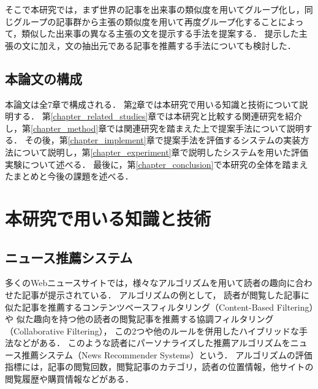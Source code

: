\documentclass[12pt,a4j,dvipdfmx]{jreport}
\begin{document}


そこで本研究では，まず世界の記事を出来事の類似度を用いてグループ化し，同じグループの記事群から主張の類似度を用いて再度グループ化することによって，類似した出来事の異なる主張の文を提示する手法を提案する．
提示した主張の文に加え，文の抽出元である記事を推薦する手法についても検討した．



\section{本論文の構成}
本論文は全7章で構成される．
第\ref{chapter_knowledge_and_technologies}章では本研究で用いる知識と技術について説明する．
第\ref{chapter_related_studies}章では本研究と比較する関連研究を紹介し，第\ref{chapter_method}章では関連研究を踏まえた上で提案手法について説明する．
その後，第\ref{chapter_implement}章で提案手法を評価するシステムの実装方法について説明し，第\ref{chapter_experiment}章で説明したシステムを用いた評価実験について述べる．
最後に，第\ref{chapter_conclusion}で本研究の全体を踏まえたまとめと今後の課題を述べる．

\chapter{本研究で用いる知識と技術}
\label{chapter_knowledge_and_technologies}
\section{ニュース推薦システム}
多くのWebニュースサイトでは，様々なアルゴリズムを用いて読者の趣向に合わせた記事が提示されている．
アルゴリズムの例として，
読者が閲覧した記事に似た記事を推薦するコンテンツベースフィルタリング（Content-Based Filtering）や
似た趣向を持つ他の読者の閲覧記事を推薦する協調フィルタリング（Collaborative Filtering），
この2つや他のルールを併用したハイブリッドな手法などがある\cite{karimi_news_2018}．
このような読者にパーソナライズした推薦アルゴリズムをニュース推薦システム（News Recommender Systems）という．
アルゴリズムの評価指標には，記事の閲覧回数，閲覧記事のカテゴリ，読者の位置情報，他サイトの閲覧履歴や購買情報などがある．
\end{document}
